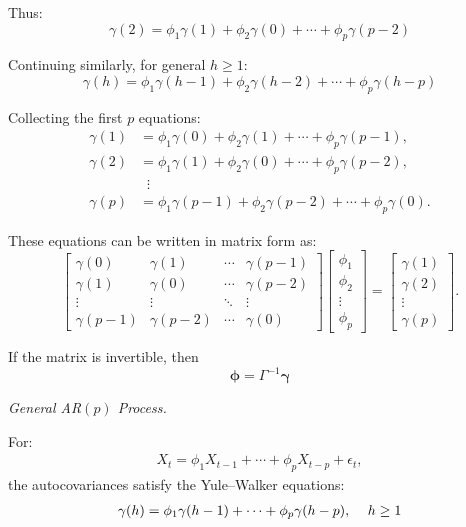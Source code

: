 \documentclass[10pt,a4paper]{article}
\begin{document}
	Thus:
	\[
	\gamma(2) = \phi_1 \gamma(1) + \phi_2 \gamma(0) + \cdots + \phi_p \gamma(p-2)
	\]
	
	\medskip
	
	Continuing similarly, for general \(h \geq 1\):
	\[
	\gamma(h) = \phi_1 \gamma(h-1) + \phi_2 \gamma(h-2) + \cdots + \phi_p \gamma(h-p)
	\]
	
	\medskip
	
	Collecting the first \(p\) equations:
	\begin{align*}
	\gamma(1) &= \phi_1 \gamma(0) + \phi_2 \gamma(1) + \cdots + \phi_p \gamma(p-1), \\
	\gamma(2) &= \phi_1 \gamma(1) + \phi_2 \gamma(0) + \cdots + \phi_p \gamma(p-2), \\
	&\;\;\vdots \\
	\gamma(p) &= \phi_1 \gamma(p-1) + \phi_2 \gamma(p-2) + \cdots + \phi_p \gamma(0).
	\end{align*}
	
	\medskip
	
	These equations can be written in matrix form as:
	\[
	\begin{bmatrix}
	\gamma(0) & \gamma(1) & \cdots & \gamma(p-1) \\
	\gamma(1) & \gamma(0) & \cdots & \gamma(p-2) \\
	\vdots & \vdots & \ddots & \vdots \\
	\gamma(p-1) & \gamma(p-2) & \cdots & \gamma(0)
	\end{bmatrix}
	\begin{bmatrix}
	\phi_1 \\
	\phi_2 \\
	\vdots \\
	\phi_p
	\end{bmatrix}
	=
	\begin{bmatrix}
	\gamma(1) \\
	\gamma(2) \\
	\vdots \\
	\gamma(p)
	\end{bmatrix}.
	\]
	
	\medskip
	
	If the matrix is invertible, then
	\[
	\boldsymbol{\phi} = \Gamma^{-1} \boldsymbol{\gamma}
	\]
	
	
	\textit{General AR$(p)$ Process.}
	
	For:
	\begin{align*}
	X_t = \phi_1 X_{t-1} + \cdots + \phi_p X_{t-p} + \epsilon_t,
	\end{align*}
	the autocovariances satisfy the Yule--Walker equations:
	\begin{align*}
	\large \gamma(h) = \phi_1 \gamma(h-1) + \cdots + \phi_p \gamma(h-p), \quad h \geq 1
	\end{align*}
	
\end{document}

